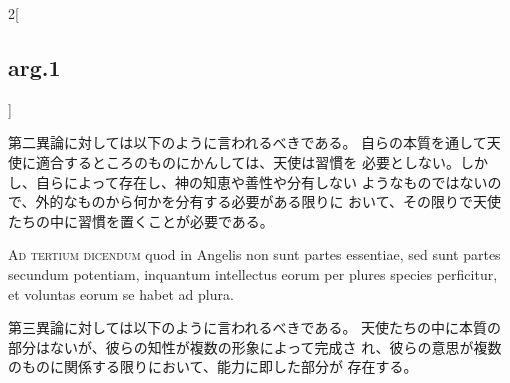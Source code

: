 \documentclass[paper=a4paper,fontsize=10pt,jafontsize=9pt,titlepage]{jlreq}
\begin{document}
\begin{paracol}{2}[\subsection{arg.1}]
\switchcolumn

第二異論に対しては以下のように言われるべきである。
自らの本質を通して天使に適合するところのものにかんしては、天使は習慣を
 必要としない。しかし、自らによって存在し、神の知恵や善性や分有しない
 ようなものではないので、外的なものから何かを分有する必要がある限りに
 おいて、その限りで天使たちの中に習慣を置くことが必要である。

\switchcolumn*[\subsection{ad.3}]

{\scshape Ad tertium dicendum} quod in Angelis non sunt partes essentiae, sed
 sunt partes secundum potentiam, inquantum intellectus eorum per
 plures species perficitur, et voluntas eorum se habet ad plura.

\switchcolumn

第三異論に対しては以下のように言われるべきである。
天使たちの中に本質の部分はないが、彼らの知性が複数の形象によって完成さ
 れ、彼らの意思が複数のものに関係する限りにおいて、能力に即した部分が
 存在する。

\end{paracol}
\end{document}
